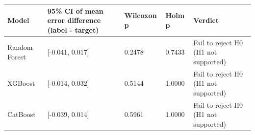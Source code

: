 \begin{tabular}{lllll}
\toprule
Model & 95\% CI of mean error difference (label - target) & Wilcoxon p & Holm p & Verdict \\
\midrule
Random Forest & [-0.041, 0.017] & 0.2478 & 0.7433 & Fail to reject H0 (H1 not supported) \\
XGBoost & [-0.014, 0.032] & 0.5144 & 1.0000 & Fail to reject H0 (H1 not supported) \\
CatBoost & [-0.039, 0.014] & 0.5961 & 1.0000 & Fail to reject H0 (H1 not supported) \\
\bottomrule
\end{tabular}
